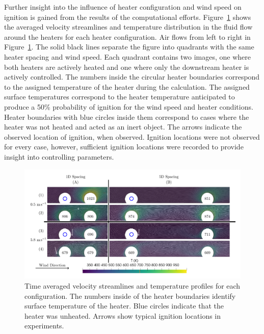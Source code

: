     Further insight into the influence of heater configuration and wind speed on ignition is gained from the results of the computational efforts. Figure~\ref{fig:multiHeaterCFD} shows the averaged velocity streamlines and temperature distribution in the fluid flow around the heaters for each heater configuration. Air flows from left to right in Figure~\ref{fig:multiHeaterCFD}. The solid black lines separate the figure into quadrants with the same heater spacing and wind speed. Each quadrant contains two images, one where both heaters are actively heated and one where only the downstream heater is actively controlled. The numbers inside the circular heater boundaries correspond to the assigned temperature of the heater during the calculation. The assigned surface temperatures correspond to the heater temperature anticipated to produce a 50\% probability of ignition for the wind speed and heater conditions. Heater boundaries with blue circles inside them correspond to cases where the heater was not heated and acted as an inert object. The arrows indicate the observed location of ignition, when observed. Ignition locations were not observed for every case, however, sufficient ignition locations were recorded to provide insight into controlling parameters.
        \begin{figure}
            \centering
            \includegraphics[width=\columnwidth]{Figures/multiHeaterCFDstreamlines.pdf}
            \caption{Time averaged velocity streamlines and temperature profiles for each configuration. The numbers inside of the heater boundaries identify surface temperature of the heater. Blue circles indicate that the heater was unheated. Arrows show typical ignition locations in experiments.}
            \label{fig:multiHeaterCFD}
        \end{figure}
    \par
